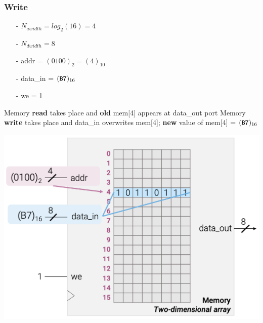 \documentclass[12pt,openany]{book}
\begin{document}
\subsubsection{Write}
\noindent
\begin{minipage}[htp]{0.4\textwidth}

\begin{itemize}
    \item[-] $N_{awidth} = log_2(16) = 4$
    \item[-] $N_{dwidth} = 8$
    \item[-] addr = $(0100)_2 = (4)_{10}$ 
    \item[-] data\_in = $(\textbf{\texttt{B7}})_{16}$
    \item[-] we = 1
\end{itemize}

\begin{justify}
	Memory \textbf{read} takes place and \textbf{old} mem[4] appears at data\_out port
	\newline
	\vspace*{10px}
	Memory \textbf{write} takes place and data\_in overwrites mem[4]; \textbf{new} value of mem[4] = $(\textbf{\texttt{B7}})_{16}$
\end{justify}
\end{minipage}%
\hfill
\vline
\hfill
\hspace*{-20px}
\begin{minipage}[htp]{0.5\textwidth}
\centering
\includegraphics[width=1.3\textwidth]{circuits/16.2.5.png}
\end{minipage}
\newpage
\end{document}

